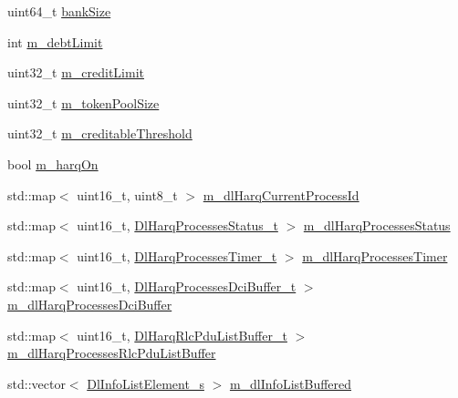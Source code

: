 \begin{DoxyCompactItemize}
\item 
uint64\+\_\+t \hyperlink{classns3_1_1TdTbfqFfMacScheduler_af215332201b187b2699413c222d0c88d}{bank\+Size}
\item 
int \hyperlink{classns3_1_1TdTbfqFfMacScheduler_a9c3d40d1117e3afd1dbb4747008d256e}{m\+\_\+debt\+Limit}
\item 
uint32\+\_\+t \hyperlink{classns3_1_1TdTbfqFfMacScheduler_a4fcf66ab5e783305bad38c4667f2cfd0}{m\+\_\+credit\+Limit}
\item 
uint32\+\_\+t \hyperlink{classns3_1_1TdTbfqFfMacScheduler_ac14d4dbc811afa558ad1b7fc125b188b}{m\+\_\+token\+Pool\+Size}
\item 
uint32\+\_\+t \hyperlink{classns3_1_1TdTbfqFfMacScheduler_a776a405971c9f74b3ad96379a9aa7abe}{m\+\_\+creditable\+Threshold}
\item 
bool \hyperlink{classns3_1_1TdTbfqFfMacScheduler_afbd88f1e039b365dcdbb076e99ce5506}{m\+\_\+harq\+On}
\item 
std\+::map$<$ uint16\+\_\+t, uint8\+\_\+t $>$ \hyperlink{classns3_1_1TdTbfqFfMacScheduler_ad1c507f0824369e326a2f4594a19f5e9}{m\+\_\+dl\+Harq\+Current\+Process\+Id}
\item 
std\+::map$<$ uint16\+\_\+t, \hyperlink{namespacens3_a457b3571b67ff17d042e9894e90e2ce2}{Dl\+Harq\+Processes\+Status\+\_\+t} $>$ \hyperlink{classns3_1_1TdTbfqFfMacScheduler_a3d25806fc0b4360d668951f3a6b96b8d}{m\+\_\+dl\+Harq\+Processes\+Status}
\item 
std\+::map$<$ uint16\+\_\+t, \hyperlink{namespacens3_a39413ade536de4b1c82d6c0074cc703e}{Dl\+Harq\+Processes\+Timer\+\_\+t} $>$ \hyperlink{classns3_1_1TdTbfqFfMacScheduler_a772806188cbe19e816a9eab534733ee1}{m\+\_\+dl\+Harq\+Processes\+Timer}
\item 
std\+::map$<$ uint16\+\_\+t, \hyperlink{namespacens3_af25599bf8f9f564075c005759c9af18c}{Dl\+Harq\+Processes\+Dci\+Buffer\+\_\+t} $>$ \hyperlink{classns3_1_1TdTbfqFfMacScheduler_a50d8986111a3dc24130127d3ea391d7e}{m\+\_\+dl\+Harq\+Processes\+Dci\+Buffer}
\item 
std\+::map$<$ uint16\+\_\+t, \hyperlink{namespacens3_a4c0cbd1e72f1c667f8b5879655f13210}{Dl\+Harq\+Rlc\+Pdu\+List\+Buffer\+\_\+t} $>$ \hyperlink{classns3_1_1TdTbfqFfMacScheduler_a997b6649f2a69dd389d9a4381707b755}{m\+\_\+dl\+Harq\+Processes\+Rlc\+Pdu\+List\+Buffer}
\item 
std\+::vector$<$ \hyperlink{structns3_1_1DlInfoListElement__s}{Dl\+Info\+List\+Element\+\_\+s} $>$ \hyperlink{classns3_1_1TdTbfqFfMacScheduler_aabf2460c78d16c5202cdcda020ba06dd}{m\+\_\+dl\+Info\+List\+Buffered}

\end{DoxyCompactItemize}
